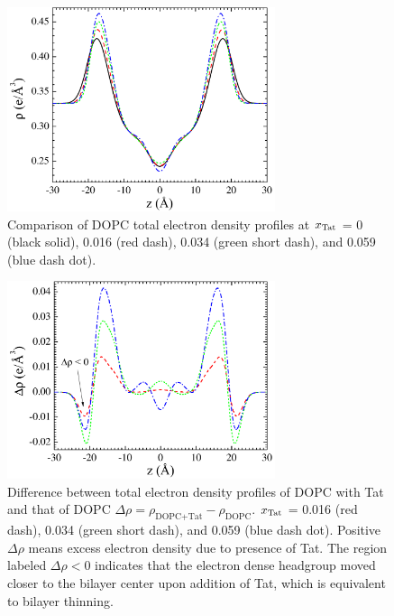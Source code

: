 \begin{figure}[htbp]
  \centering
  \includegraphics[width=0.7\textwidth]{figures/Tat/SDP_Results/EDP/DOPC_Tat_total_EDP}
  \caption[Comparison of DOPC total electron density profiles at $\xTat$ = 0 (black solid),
  0.016 (red dash), 0.034 (green short dash), and 0.059 (blue dash dot)]
  {Comparison of DOPC total electron density profiles at $\xTat$ = 0 (black solid),
  0.016 (red dash), 0.034 (green short dash), and 0.059 (blue dash dot).}
  \label{fig:DOPC_Tat_total_EDP}
\end{figure}

\begin{figure}[htbp]
  \centering
  \includegraphics[width=0.7\textwidth]{figures/Tat/SDP_Results/EDP/DOPC_Tat_total_EDP_diff}
  \caption[Difference between total electron density profiles of DOPC with Tat 
  and that of DOPC $\Delta\rho = \rho_\text{DOPC+Tat} - \rho_\text{DOPC}$]
  {Difference between total electron density profiles of DOPC with Tat 
  and that of DOPC $\Delta\rho = \rho_\text{DOPC+Tat} - \rho_\text{DOPC}$. 
  $\xTat$ = 0.016 (red dash), 0.034 (green short dash), 
  and 0.059 (blue dash dot). Positive $\Delta\rho$ means excess electron density 
  due to presence of Tat. The region labeled $\Delta\rho < 0$ indicates that 
  the electron dense headgroup moved closer to the bilayer center upon addition of Tat,
  which is equivalent to bilayer thinning.}
  \label{fig:DOPC_Tat_total_EDP_difference}
\end{figure}

